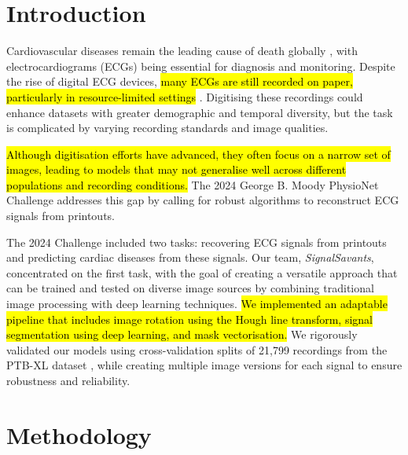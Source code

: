 \documentclass[twocolumn]{cinc}
\newcommand{\cP}[1]{{\sethlcolor{cProblemBg}\hl{#1}}}
\newcommand{\cM}[1]{{\sethlcolor{cMethodBg}\hl{#1}}}
\newcommand{\cG}[1]{{\sethlcolor{cGapBg}\hl{#1}}}
\begin{document}
\section{Introduction}
Cardiovascular diseases remain the leading cause of death globally \cite{whoCardiovascularDiseases}, with electrocardiograms (ECGs) being essential for diagnosis and monitoring. Despite the rise of digital ECG devices, \cP{many ECGs are still recorded on paper, particularly in resource-limited settings} \cite{challenge2024}. Digitising these recordings could enhance datasets with greater demographic and temporal diversity, but the task is complicated by varying recording standards and image qualities.

\cG{Although digitisation efforts have advanced, they often focus on a narrow set of images, leading to models that may not generalise well across different populations and recording conditions.} The 2024 George B. Moody PhysioNet Challenge \cite{challenge2024} addresses this gap by calling for robust algorithms to reconstruct ECG signals from printouts.

The 2024 Challenge included two tasks: recovering ECG signals from printouts and predicting cardiac diseases from these signals. Our team, {\it SignalSavants}, concentrated on the first task, with the goal of creating a versatile approach that can be trained and tested on diverse image sources by combining traditional image processing with deep learning techniques. \cM{We implemented an adaptable pipeline that includes image rotation using the Hough line transform, signal segmentation using deep learning, and mask vectorisation.} We rigorously validated our models using cross-validation splits of 21,799 recordings from the PTB-XL dataset \cite{wagner2022ptbxl, wagner2020ptbxl}, while creating multiple image versions for each signal to ensure robustness and reliability.



\section{Methodology}
\end{document}
